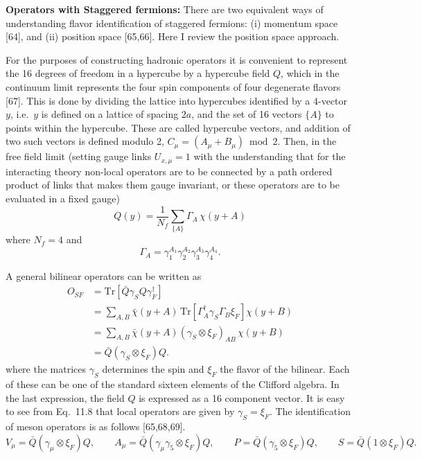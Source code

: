 \textbf{Operators with Staggered fermions:} There are two equivalent ways
of understanding flavor identification of staggered fermions: (i) momentum
space [64], and (ii) position space [65,66]. Here I review the position space
approach.

For the purposes of constructing hadronic operators it is convenient to
represent the 16 degrees of freedom in a hypercube by a hypercube field $Q$,
which in the continuum limit represents the four spin components of four
degenerate flavors [67]. This is done by dividing the lattice into hypercubes
identified by a 4-vector $y$, i.e.\ $y$ is defined on a lattice of spacing $2a$, and
the set of 16 vectors $\{A\}$ to points within the hypercube. These are called
hypercube vectors, and addition of two such vectors is defined modulo 2,
$C_\mu = (A_\mu + B_\mu)\bmod 2$. Then, in the free field limit (setting gauge links
$U_{x,\mu} = 1$ with the understanding that for the interacting theory non-local
operators are to be connected by a path ordered product of links that
makes them gauge invariant, or these operators are to be evaluated in a
fixed gauge)
\begin{equation}
Q(y) = \frac{1}{N_f}\sum_{\{A\}}\Gamma_A\,\chi(y+A)
\label{eq:sf-hypercube-field}
\end{equation}
where $N_f = 4$ and
\begin{equation}
\Gamma_A = \gamma_1^{A_1}\gamma_2^{A_2}\gamma_3^{A_3}\gamma_4^{A_4} .
\label{eq:sf-gamma-A}
\end{equation}

A general bilinear operators can be written as
\begin{equation}
\begin{aligned}
O_{SF} &= \text{Tr}\left[\bar{Q}\gamma_S Q\gamma_F^\dagger\right] \\
&= \sum_{A,B}\bar{\chi}(y+A)\,\text{Tr}\left[\Gamma_A^\dagger\gamma_S\Gamma_B\xi_F\right]\chi(y+B) \\
&= \sum_{A,B}\bar{\chi}(y+A)(\gamma_S\otimes\xi_F)_{AB}\,\chi(y+B) \\
&= \bar{Q}(\gamma_S\otimes\xi_F)Q .
\end{aligned}
\label{eq:sf-bilinear}
\end{equation}
where the matrices $\gamma_S$ determines the spin and $\xi_F$ the flavor of the bilinear.
Each of these can be one of the standard sixteen elements of the Clifford
algebra. In the last expression, the field $Q$ is expressed as a 16 component
vector. It is easy to see from Eq.~11.8 that local operators are given by
$\gamma_S = \xi_F$. The identification of meson operators is as follows [65,68,69].
\begin{equation}
V_\mu = \bar{Q}(\gamma_\mu\otimes\xi_F)Q, \qquad
A_\mu = \bar{Q}(\gamma_\mu\gamma_5\otimes\xi_F)Q, \qquad
P = \bar{Q}(\gamma_5\otimes\xi_F)Q, \qquad
S = \bar{Q}(1\otimes\xi_F)Q .
\label{eq:sf-mesons}
\end{equation}

